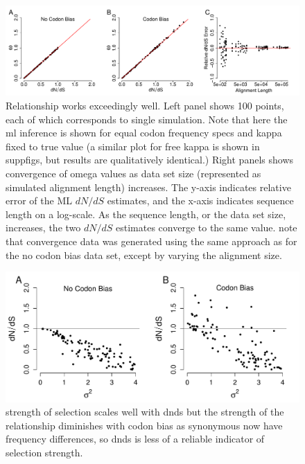 \documentclass[11pt]{article}
\begin{document}
\begin{figure}[H]
\centerline{\includegraphics[width=8in]{figures/MainText/regression_convergence.pdf}}
\caption{\label{reg_conv} Relationship works exceedingly well. Left panel shows 100 points, each of which corresponds to single simulation. Note that here the ml inference is shown for equal codon frequency specs and kappa fixed to true value (a similar plot for free kappa is shown in suppfigs, but results are qualitatively identical.) Right panels shows convergence of omega values as data set size (represented as simulated alignment length) increases. The y-axis indicates relative error of the ML $dN/dS$ estimates, and the x-axis indicates sequence length on a log-scale. As the sequence length, or the data set size, increases, the two $dN/dS$ estimates converge to the same value. note that convergence data was generated using the same approach as for the no codon bias data set, except by varying the alignment size.}
\end{figure}


\bigskip
\begin{figure}[H]
\centerline{\includegraphics[width=6in]{figures/MainText/sd_vs_dnds.pdf}}
\caption{\label{stddev_dnds} strength of selection scales well with dnds but the strength of the relationship diminishes with codon bias as synonymous now have frequency differences, so dnds is less of a reliable indicator of selection strength.}
\end{figure}
\end{document}
